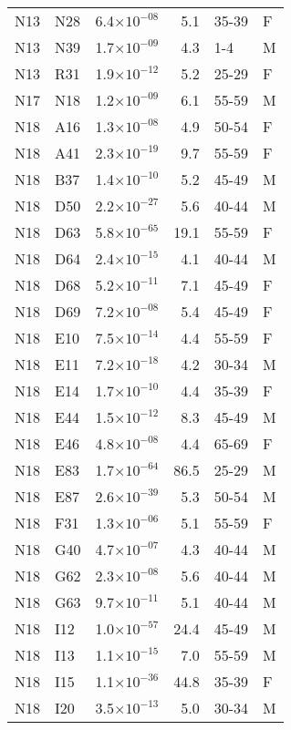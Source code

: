 \begin{longtable}{lllrll}
   N13 & N28 & 6.4$\times10^{-08}$ & 5.1 & 35-39 & F \\ 
   N13 & N39 & 1.7$\times10^{-09}$ & 4.3 & 1-4 & M \\ 
   N13 & R31 & 1.9$\times10^{-12}$ & 5.2 & 25-29 & F \\ 
   N17 & N18 & 1.2$\times10^{-09}$ & 6.1 & 55-59 & M \\ 
   N18 & A16 & 1.3$\times10^{-08}$ & 4.9 & 50-54 & F \\ 
   N18 & A41 & 2.3$\times10^{-19}$ & 9.7 & 55-59 & F \\ 
   N18 & B37 & 1.4$\times10^{-10}$ & 5.2 & 45-49 & M \\ 
   N18 & D50 & 2.2$\times10^{-27}$ & 5.6 & 40-44 & M \\ 
   N18 & D63 & 5.8$\times10^{-65}$ & 19.1 & 55-59 & F \\ 
   N18 & D64 & 2.4$\times10^{-15}$ & 4.1 & 40-44 & M \\ 
   N18 & D68 & 5.2$\times10^{-11}$ & 7.1 & 45-49 & F \\ 
   N18 & D69 & 7.2$\times10^{-08}$ & 5.4 & 45-49 & F \\ 
   N18 & E10 & 7.5$\times10^{-14}$ & 4.4 & 55-59 & F \\ 
   N18 & E11 & 7.2$\times10^{-18}$ & 4.2 & 30-34 & M \\ 
   N18 & E14 & 1.7$\times10^{-10}$ & 4.4 & 35-39 & F \\ 
   N18 & E44 & 1.5$\times10^{-12}$ & 8.3 & 45-49 & M \\ 
   N18 & E46 & 4.8$\times10^{-08}$ & 4.4 & 65-69 & F \\ 
   N18 & E83 & 1.7$\times10^{-64}$ & 86.5 & 25-29 & M \\ 
   N18 & E87 & 2.6$\times10^{-39}$ & 5.3 & 50-54 & M \\ 
   N18 & F31 & 1.3$\times10^{-06}$ & 5.1 & 55-59 & F \\ 
   N18 & G40 & 4.7$\times10^{-07}$ & 4.3 & 40-44 & M \\ 
   N18 & G62 & 2.3$\times10^{-08}$ & 5.6 & 40-44 & M \\ 
   N18 & G63 & 9.7$\times10^{-11}$ & 5.1 & 40-44 & M \\ 
   N18 & I12 & 1.0$\times10^{-57}$ & 24.4 & 45-49 & M \\ 
   N18 & I13 & 1.1$\times10^{-15}$ & 7.0 & 55-59 & M \\ 
   N18 & I15 & 1.1$\times10^{-36}$ & 44.8 & 35-39 & F \\ 
   N18 & I20 & 3.5$\times10^{-13}$ & 5.0 & 30-34 & M \\ 

\end{longtable}
